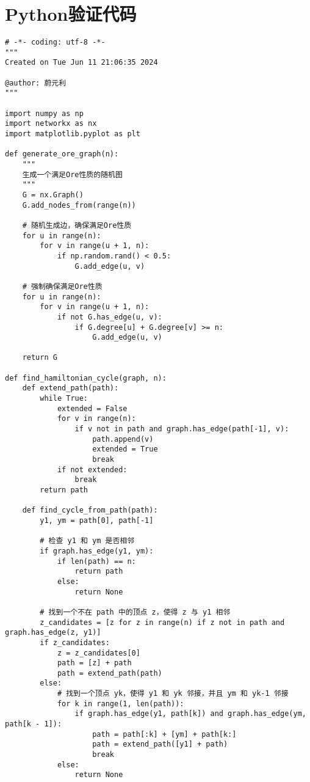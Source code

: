 \documentclass{article}
\begin{document}
\section{Python验证代码}
\begin{lstlisting}
# -*- coding: utf-8 -*-
"""
Created on Tue Jun 11 21:06:35 2024

@author: 蔚元利
"""

import numpy as np
import networkx as nx
import matplotlib.pyplot as plt

def generate_ore_graph(n):
    """
    生成一个满足Ore性质的随机图
    """
    G = nx.Graph()
    G.add_nodes_from(range(n))
    
    # 随机生成边，确保满足Ore性质
    for u in range(n):
        for v in range(u + 1, n):
            if np.random.rand() < 0.5:
                G.add_edge(u, v)
    
    # 强制确保满足Ore性质
    for u in range(n):
        for v in range(u + 1, n):
            if not G.has_edge(u, v):
                if G.degree[u] + G.degree[v] >= n:
                    G.add_edge(u, v)
    
    return G

def find_hamiltonian_cycle(graph, n):
    def extend_path(path):
        while True:
            extended = False
            for v in range(n):
                if v not in path and graph.has_edge(path[-1], v):
                    path.append(v)
                    extended = True
                    break
            if not extended:
                break
        return path

    def find_cycle_from_path(path):
        y1, ym = path[0], path[-1]
        
        # 检查 y1 和 ym 是否相邻
        if graph.has_edge(y1, ym):
            if len(path) == n:
                return path
            else:
                return None
        
        # 找到一个不在 path 中的顶点 z，使得 z 与 y1 相邻
        z_candidates = [z for z in range(n) if z not in path and graph.has_edge(z, y1)]
        if z_candidates:
            z = z_candidates[0]
            path = [z] + path
            path = extend_path(path)
        else:
            # 找到一个顶点 yk，使得 y1 和 yk 邻接，并且 ym 和 yk-1 邻接
            for k in range(1, len(path)):
                if graph.has_edge(y1, path[k]) and graph.has_edge(ym, path[k - 1]):
                    path = path[:k] + [ym] + path[k:]
                    path = extend_path([y1] + path)
                    break
            else:
                return None
        

\end{lstlisting}
\end{document}

